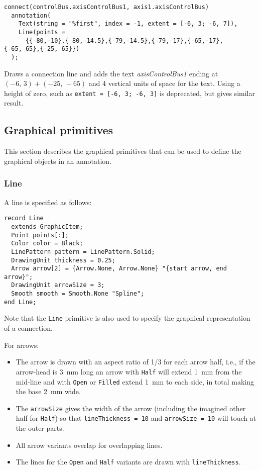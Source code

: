 \begin{example}
\begin{lstlisting}[language=modelica]
connect(controlBus.axisControlBus1, axis1.axisControlBus)
  annotation(
    Text(string = "%first", index = -1, extent = [-6, 3; -6, 7]),
    Line(points =
      {{-80,-10},{-80,-14.5},{-79,-14.5},{-79,-17},{-65,-17},{-65,-65},{-25,-65}})
  );
\end{lstlisting}
Draws a connection line and adds the text \emph{axisControlBus1} ending at $(-6,\, 3) + (-25,\, -65)$ and 4 vertical units of space for the text.
Using a height of zero, such as \lstinline!extent = [-6, 3; -6, 3]! is deprecated, but gives similar result.
\end{example}

\subsection{Graphical primitives}\label{graphical-primitives}

This section describes the graphical primitives that can be used to
define the graphical objects in an annotation.

\subsubsection{Line}\label{line}

A line is specified as follows:
\begin{lstlisting}[language=modelica]
record Line
  extends GraphicItem;
  Point points[:];
  Color color = Black;
  LinePattern pattern = LinePattern.Solid;
  DrawingUnit thickness = 0.25;
  Arrow arrow[2] = {Arrow.None, Arrow.None} "{start arrow, end arrow}";
  DrawingUnit arrowSize = 3;
  Smooth smooth = Smooth.None "Spline";
end Line;
\end{lstlisting}%
Note that the \lstinline!Line! primitive is also used to specify the graphical representation of a connection.

For arrows:
\begin{itemize}
\item
  The arrow is drawn with an aspect ratio of 1/3 for each arrow half, i.e., if the arrow-head is 3~mm long an arrow with \lstinline!Half! will extend 1~mm from the mid-line and with \lstinline!Open! or \lstinline!Filled! extend 1~mm to each side, in total making the base 2~mm wide.
\item
  The \lstinline!arrowSize! gives the width of the arrow (including the imagined other half for \lstinline!Half!) so that \lstinline!lineThickness = 10! and \lstinline!arrowSize = 10! will touch at the outer parts.
\item
  All arrow variants overlap for overlapping lines.
\item
  The lines for the \lstinline!Open! and \lstinline!Half! variants are drawn with \lstinline!lineThickness!.
\end{itemize}

